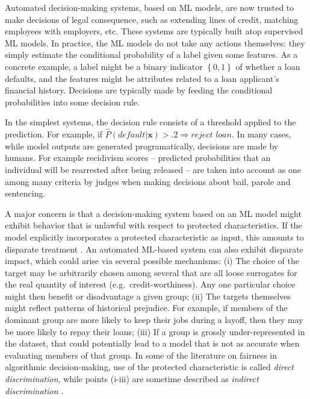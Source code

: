 
Automated decision-making systems,
based on ML models, 
are now trusted to make decisions of legal consequence, such as extending lines of credit, 
matching employees with employers, etc.
These systems are typically built atop supervised ML models.
In practice, the ML models 
do not take any actions themselves:
they simply estimate the conditional probability 
of a label given some features.
As a concrete example,
a label might be a binary indicator $\left \lbrace 0, 1 \right\rbrace$ 
of whether a loan defaults, 
and the features might be attributes 
related to a loan applicant's financial history.
Decisions are typically made by feeding the conditional probabilities into some decision rule. 

In the simplest systems, the decision rule consists of a threshold applied to the prediction.
For example, if $\hat P(\textit{default}|\mathbf{x}) > .2 \Rightarrow \textit{reject loan}$.
In many cases, while model outputs are generated programatically,
decisions are made by humans. 
For example recidivism scores 
-- predicted probabilities that an individual
will be rearrested after being released --
are taken into account as one among many criteria 
by judges when making decisions about bail, parole and sentencing.

A major concern is that a decision-making system based on an ML model
might exhibit behavior 
that is unlawful with respect to protected characteristics.
If the model explicitly incorporates a protected characteristic as input,
this amounts to disparate treatment \cite{CivilRights1964, barocas2016big, zafar2017fairness}.
An automated ML-based system can also exhibit disparate impact,
which could arise via several possible mechanisms: 
(i) The choice of the target may be arbitrarily chosen 
among several that are all loose surrogates 
for the real quantity of interest (e.g.~credit-worthiness).
Any one particular choice might then benefit or disadvantage a given group;
(ii) The targets themselves might reflect patterns of historical prejudice.
For example, if members of the dominant group 
are more likely to keep their jobs during a layoff, 
then they may be more likely to repay their loans;
(iii) If a group is grossly under-represented in the dataset, 
that could potentially lead to a model 
that is not as accurate when evaluating members of that group.
In some of the literature on fairness in algorithmic decision-making, 
use of the protected characteristic is called \emph{direct discrimination},
while points (i-iii) are sometime described as \emph{indirect discrimination} \cite{pedreshi2008discrimination,kamishima2011fairness}.


